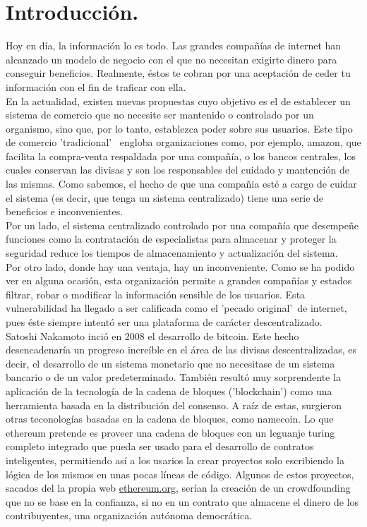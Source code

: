 \documentclass[11pt,a4paper]{article}
\begin{document}
\section{Introducción.}
Hoy en día, la información lo es todo. Las grandes compañías de internet han alcanzado un modelo de negocio con el que no necesitan exigirte dinero para conseguir beneficios. Realmente, éstos te cobran por una aceptación de ceder tu información con el fin de traficar con ella. \\

En la actualidad, existen nuevas propuestas cuyo objetivo es el de establecer un sistema de comercio que no necesite ser mantenido o controlado por un organismo, sino que, por lo tanto, establezca poder sobre sus usuarios. Este tipo de comercio 'tradicional' \ engloba organizaciones como, por ejemplo, amazon, que facilita la compra-venta respaldada por una compañía, o los bancos centrales, los cuales conservan las divisas y son los responsables del cuidado y mantención de las mismas. Como sabemos, el hecho de que una compañia esté a cargo de cuidar el sistema (es decir, que tenga un sistema centralizado) tiene una serie de beneficios e inconvenientes. \\

Por un lado, el sistema centralizado controlado por una compañía que desempeñe funciones como la contratación de especialistas para almacenar y proteger la seguridad reduce los tiempos de almacenamiento y actualización del sistema. \\

Por otro lado, donde hay una ventaja, hay un inconveniente. Como se ha podido ver en alguna ocasión\footnotemark, esta organización permite a grandes compañías y estados filtrar, robar o modificar la información sensible de los usuarios. Esta vulnerabilidad ha llegado a ser calificada como el 'pecado original'\ de internet, pues éste siempre intentó ser una plataforma de carácter descentralizado.\\

Satoshi Nakamoto inció en 2008 el desarrollo de bitcoin. Este hecho desencadenaría un progreso increíble en el área de las divisas descentralizadas, es decir, el desarrollo de un sistema monetario que no necesitase de un sistema bancario o de un valor predeterminado. También resultó muy sorprendente la aplicación de la tecnología de la cadena de bloques ('blockchain') como una herramienta basada en la distribución del consenso. A raíz de estas, surgieron otras teconologías basadas en la cadena de bloques, como namecoin. Lo que ethereum pretende es proveer una cadena de bloques con un leguanje turing completo integrado que pueda ser usado para el desarrollo de contratos inteligentes, permitiendo así a los usarios la crear proyectos solo escribiendo la lógica de los mismos en unas pocas líneas de código. Algunos de estos proyectos, sacados del la propia web \url{ethereum.org}, serían la creación de un crowdfounding que no se base en la confianza, si no en un contrato que almacene el dinero de los contribuyentes, una organización autónoma democrática.\\
\end{document}
